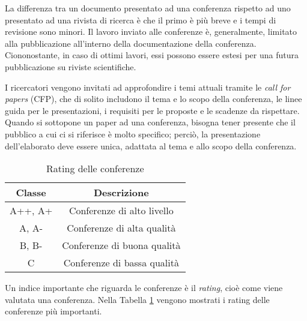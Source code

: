 
La differenza tra un documento presentato ad una conferenza rispetto ad uno
presentato ad una rivista di ricerca è che il primo è più breve e i tempi
di revisione sono minori. Il lavoro inviato alle conferenze è, generalmente,
limitato alla pubblicazione all’interno della documentazione della conferenza.
Ciononostante, in caso di ottimi lavori, essi possono essere estesi per una
futura pubblicazione su riviste scientifiche.

I ricercatori vengono invitati ad approfondire i temi attuali tramite le
\textit{call for papers} (CFP), che di solito includono il tema e lo scopo della
conferenza, le linee guida per le presentazioni, i requisiti per le proposte
e le scadenze da rispettare. Quando si sottopone un paper ad una conferenza,
bisogna tener presente che il pubblico a cui ci si riferisce è molto specifico;
perciò, la presentazione dell’elaborato deve essere unica, adattata al tema e
allo scopo della conferenza.


\begin{table}
    \centering
    \begin{tabular}{||c c ||} 
     \hline
     Classe & Descrizione \\ [0.5ex] 
     \hline\hline
     A++, A+ & Conferenze di alto livello \\ 
     \hline
     A, A- & Conferenze di alta qualità \\
     \hline
     B, B- & Conferenze di buona qualità \\
     \hline
     C & Conferenze di bassa qualità \\
     \hline
    \end{tabular}
    \caption{Rating delle conferenze}
    \label{table:ratings}
\end{table}


Un indice importante che riguarda le conferenze è il \textit{rating}, cioè
come viene valutata una conferenza. Nella Tabella \ref{table:ratings} vengono
mostrati i rating delle conferenze più importanti.

